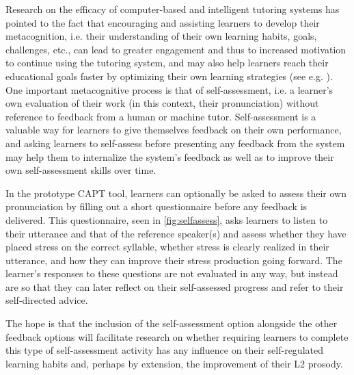 		
		Research on the efficacy of computer-based and intelligent tutoring systems has  pointed to the fact that encouraging and assisting learners to develop their metacognition, i.e. their understanding of their own learning habits, goals, challenges, etc., can lead to greater engagement and thus to increased motivation to continue using the tutoring system, and may also help learners reach their educational goals faster by optimizing their own learning strategies (see e.g. \textcite{Long2011,Long2013}). One important metacognitive process is that of self-assessment, i.e. a learner's own evaluation of their work (in this context, their pronunciation) without reference to feedback from a human or machine tutor. Self-assessment is a valuable way for learners to give themselves feedback on their own performance, and asking learners to self-assess before presenting any feedback from the system may help them to internalize the system's feedback as well as to improve their own self-assessment skills over time. 
 
 	
 	In the prototype CAPT tool, learners can optionally be asked to assess their own pronunciation by filling out a short questionnaire  before any feedback is delivered. This questionnaire, seen in \cref{fig:selfassess}, asks learners to listen to their utterance and that of the reference speaker(s) and assess whether they have placed stress on the correct syllable, whether stress is clearly realized in their utterance, and how they can improve their stress production going forward. The learner's responses to these questions are not evaluated in any way, but instead are  so that they can later reflect on their self-assessed progress and refer to their self-directed advice. 
 	
 	The hope is that the inclusion of the self-assessment option alongside the other feedback options will facilitate research on
 	whether requiring learners to complete this type of self-assessment activity has any influence on their self-regulated learning habits and, perhaps by extension, the improvement of their L2 prosody.
 	
